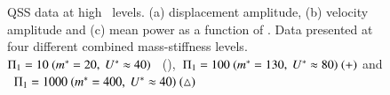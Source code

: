 \begin{figure}
{\begin{picture}
%      
%  

      
    \end{picture}
}
  \caption{QSS data at high \massstiff \ levels. (a) displacement amplitude, (b) velocity amplitude and (c) mean power as a function of \massdamp. Data presented at four different combined mass-stiffness levels.\ $\massstiff=10 \ (\mstar=20,\ \ustar \approx 40)$ \ (),\ $\massstiff=100 \ (\mstar=130,\ \ustar \approx 80) \ (+)$ and \ $\massstiff=1000 \ (\mstar=400,\ \ustar \approx 40) \ (\triangle)$}
    \label{fig:high_pi_1}
\end{figure}

